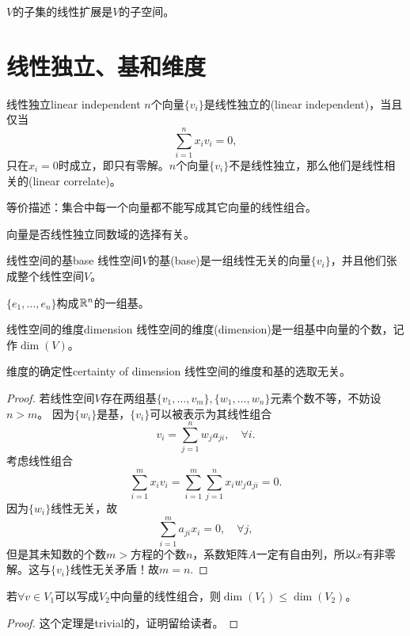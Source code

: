 \begin{corollary}
	$V$的子集的线性扩展是$V$的子空间。
\end{corollary}

\section{线性独立、基和维度}
\begin{definition}{线性独立}{linear independent}
	$n$个向量$\{v_i\}$是线性独立的(linear independent)，当且仅当
	\[
		\sum_{i=1}^nx_iv_i=0,
	\]
	只在$x_i=0$时成立，即只有零解。$n$个向量$\{v_i\}$不是线性独立，那么他们是线性相关的(linear correlate)。
	
	等价描述：集合中每一个向量都不能写成其它向量的线性组合。
\end{definition}
\begin{remark}
	向量是否线性独立同数域的选择有关。
\end{remark}
\begin{definition}{线性空间的基}{base}
	线性空间$V$的基(base)是一组线性无关的向量$\{v_i\}$，并且他们张成整个线性空间$V$。
\end{definition}
\begin{example}
	{}{}
	$\{e_1,\ldots,e_n\}$构成$\mathbb R^n$的一组基。
\end{example}
\begin{definition}{线性空间的维度}{dimension}
	线性空间的维度(dimension)是一组基中向量的个数，记作$\dim(V)$。
\end{definition}
\begin{theorem}{维度的确定性}{certainty of dimension}
	线性空间的维度和基的选取无关。
\end{theorem}
\begin{proof}
	若线性空间$V$存在两组基$\{v_1,\ldots,v_m\},\{w_1,\ldots,w_n\}$元素个数不等，不妨设$n>m$。
	因为$\{w_i\}$是基，$\{v_i\}$可以被表示为其线性组合
	\[
		v_i=\sum_{j=1}^nw_ja_{ji},\quad\forall i.
	\]
	考虑线性组合
	\[
		\sum_{i=1}^mx_iv_i=\sum_{i=1}^m\sum_{j=1}^nx_iw_ja_{ji}=0.
	\]
	因为$\{w_i\}$线性无关，故
	\[
		\sum_{i=1}^ma_{ji}x_i=0,\quad\forall j,
	\]
	但是其未知数的个数$m>$方程的个数$n$，系数矩阵$A$一定有自由列，所以$x$有非零解。这与$\{v_i\}$线性无关矛盾！故$m=n.$
\end{proof}

\begin{theorem}{}{}
	若$\forall v\in V_1$可以写成$V_2$中向量的线性组合，则$\dim(V_1)\leqslant\dim(V_2)$。
\end{theorem}

\begin{proof}
	这个定理是trivial的，证明留给读者。
\end{proof}

